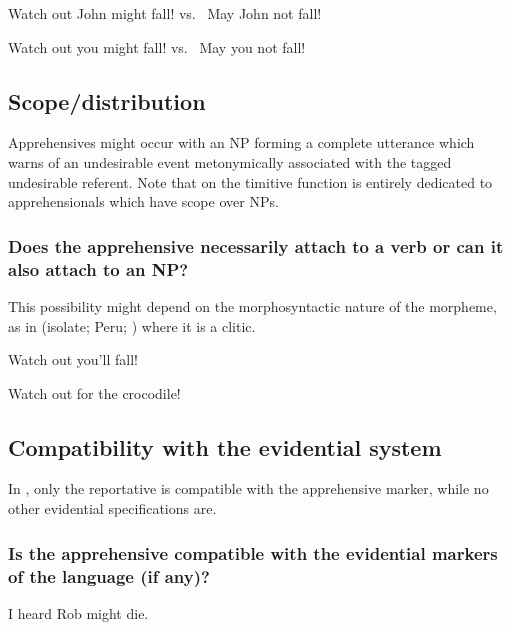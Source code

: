 \documentclass[output=paper,colorlinks,citecolor=brown]{langscibook}
\begin{document}
\ea \label{p37} {\op}Watch out{\cp} John might fall! \hspace{0.9cm} vs.\ \hspace{1cm} May John not fall!
\z

\ea \label{p38} {\op}Watch out{\cp} you might fall! \hspace{1cm} vs.\ \hspace{1cm} May you not fall!
\z



\subsection{Scope/distribution}
\label{subsec:apprscope}

Apprehensives might occur with an NP forming a complete utterance which warns of an undesirable event metonymically associated with the tagged undesirable referent. Note that  on the timitive function is entirely dedicated to apprehensionals which have scope over NPs.

\subsubsection{Does the apprehensive necessarily attach to a verb or can it also attach to an NP?}
This possibility might depend on the morphosyntactic nature of the morpheme, as in  (isolate; Peru; \cite{Olawsky2006}) where it is a clitic.
\label{1.10.1}

\ea \label{p39} {\op}Watch out{\cp} you'll fall!
\z

\ea \label{p40} {\op}Watch out for{\cp} the crocodile!
\z


\subsection{Compatibility with the evidential system}
\label{subsec:apprevidential}

In  \citep[632]{epps2008}, only the reportative is compatible with the apprehensive marker, while no other evidential specifications are.

\subsubsection{Is the apprehensive compatible with the evidential markers of the language (if any)?}
\label{1.11.1}

\ea \label{p41} {\op}I heard{\cp} Rob might die.
\z
\end{document}
